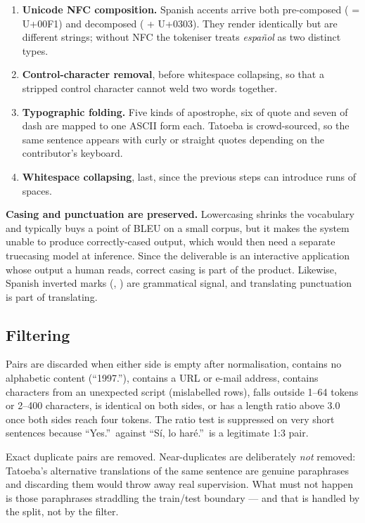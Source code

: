\documentclass[11pt,a4paper]{article}
\begin{document}
\begin{enumerate}
  \item \textbf{Unicode NFC composition.} Spanish accents arrive both
    pre-composed ( = U+00F1) and decomposed ( + U+0303). They
    render identically but are different strings; without NFC the tokeniser
    treats \emph{español} as two distinct types.
  \item \textbf{Control-character removal}, before whitespace collapsing, so
    that a stripped control character cannot weld two words together.
  \item \textbf{Typographic folding.} Five kinds of apostrophe, six of quote
    and seven of dash are mapped to one ASCII form each. Tatoeba is
    crowd-sourced, so the same sentence appears with curly or straight quotes
    depending on the contributor's keyboard.
  \item \textbf{Whitespace collapsing}, last, since the previous steps can
    introduce runs of spaces.
\end{enumerate}

\begin{decisionbox}
\textbf{Casing and punctuation are preserved.} Lowercasing shrinks the
vocabulary and typically buys a point of BLEU on a small corpus, but it makes
the system unable to produce correctly-cased output, which would then need a
separate truecasing model at inference. Since the deliverable is an interactive
application whose output a human reads, correct casing is part of the product.
Likewise, Spanish inverted marks (, ) are grammatical signal,
and translating punctuation is part of translating.
\end{decisionbox}

\subsection{Filtering}

Pairs are discarded when either side is empty after normalisation, contains no
alphabetic content (``1997.''), contains a URL or e-mail address, contains
characters from an unexpected script (mislabelled rows), falls outside
1--64 tokens or 2--400 characters, is identical on both sides, or has a
length ratio above 3.0 once both sides reach four tokens. The ratio test is
suppressed on very short sentences because ``Yes.''\ against ``Sí, lo haré.''\
is a legitimate 1:3 pair.

Exact duplicate pairs are removed. Near-duplicates are deliberately \emph{not}
removed: Tatoeba's alternative translations of the same sentence are genuine
paraphrases and discarding them would throw away real supervision. What must
not happen is those paraphrases straddling the train/test boundary --- and that
is handled by the split, not by the filter.
\end{document}
